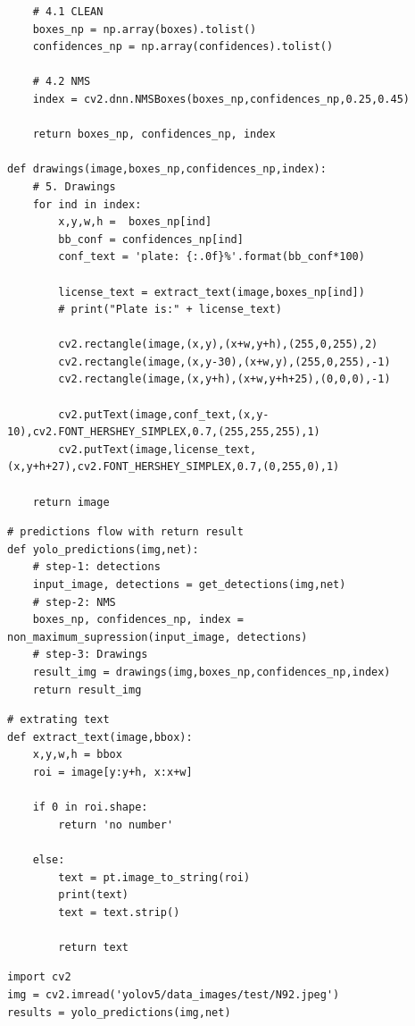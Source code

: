 \documentclass{article}
\begin{document}
\begin{verbatim}
    # 4.1 CLEAN
    boxes_np = np.array(boxes).tolist()
    confidences_np = np.array(confidences).tolist()

    # 4.2 NMS
    index = cv2.dnn.NMSBoxes(boxes_np,confidences_np,0.25,0.45)

    return boxes_np, confidences_np, index

def drawings(image,boxes_np,confidences_np,index):
    # 5. Drawings
    for ind in index:
        x,y,w,h =  boxes_np[ind]
        bb_conf = confidences_np[ind]
        conf_text = 'plate: {:.0f}%'.format(bb_conf*100)

        license_text = extract_text(image,boxes_np[ind])
        # print("Plate is:" + license_text)

        cv2.rectangle(image,(x,y),(x+w,y+h),(255,0,255),2)
        cv2.rectangle(image,(x,y-30),(x+w,y),(255,0,255),-1)
        cv2.rectangle(image,(x,y+h),(x+w,y+h+25),(0,0,0),-1)

        cv2.putText(image,conf_text,(x,y-10),cv2.FONT_HERSHEY_SIMPLEX,0.7,(255,255,255),1)
        cv2.putText(image,license_text,(x,y+h+27),cv2.FONT_HERSHEY_SIMPLEX,0.7,(0,255,0),1)

    return image
\end{verbatim}

\begin{verbatim}
# predictions flow with return result
def yolo_predictions(img,net):
    # step-1: detections
    input_image, detections = get_detections(img,net)
    # step-2: NMS
    boxes_np, confidences_np, index = non_maximum_supression(input_image, detections)
    # step-3: Drawings
    result_img = drawings(img,boxes_np,confidences_np,index)
    return result_img
\end{verbatim}

\begin{verbatim}
# extrating text
def extract_text(image,bbox):
    x,y,w,h = bbox
    roi = image[y:y+h, x:x+w]

    if 0 in roi.shape:
        return 'no number'

    else:
        text = pt.image_to_string(roi)
        print(text)
        text = text.strip()

        return text

\end{verbatim}

\begin{verbatim}
import cv2
img = cv2.imread('yolov5/data_images/test/N92.jpeg')
results = yolo_predictions(img,net)
\end{verbatim}
\end{document}
